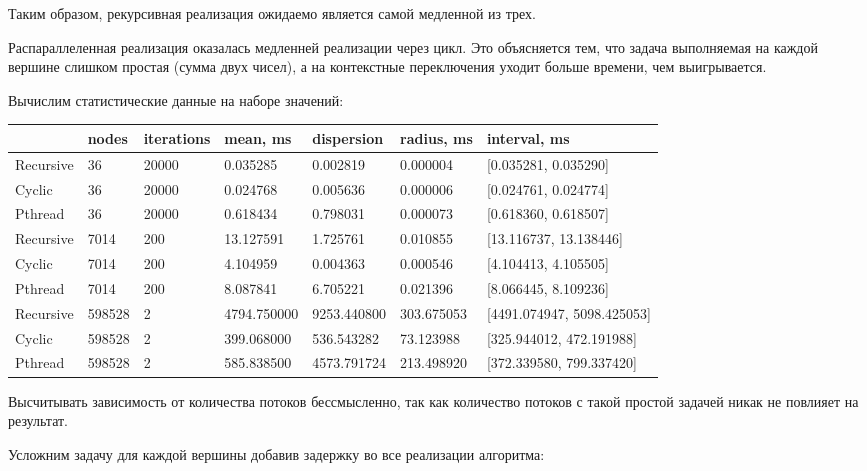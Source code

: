 \documentclass[14pt,a4paper,report]{report}
\begin{document}
Таким образом, рекурсивная реализация ожидаемо является самой медленной из трех.

Распараллеленная реализация оказалась медленней реализации через цикл. Это объясняется тем, что задача выполняемая на каждой вершине слишком простая (сумма двух чисел), а на контекстные переключения уходит больше времени, чем выигрывается.

Вычислим статистические данные на наборе значений:

\begin{table}[h!]
	\centering
	\bgroup
	\def\arraystretch{1}
	\begin{tabular}{ | m{1.5cm} | m{1.5cm} | m{1.5cm} | m{2.0cm} | m{2.0cm} | m{2.0cm} | m{4.1cm} | }
		\hline
		& nodes & iterations & mean, ms & dispersion & radius, ms & interval, ms \\ \hline
		Recursive & 36 & 20000 & 0.035285 & 0.002819 & 0.000004 & [0.035281, 0.035290] \\ \hline
		Cyclic & 36 & 20000 & 0.024768 & 0.005636 & 0.000006 & [0.024761, 0.024774] \\ \hline
		Pthread & 36 & 20000 & 0.618434 & 0.798031 & 0.000073 & [0.618360, 0.618507] \\ \hline \hline
		Recursive & 7014 & 200 & 13.127591 & 1.725761 & 0.010855 & [13.116737, 13.138446] \\ \hline
		Cyclic & 7014 & 200 & 4.104959 & 0.004363 & 0.000546 & [4.104413, 4.105505] \\ \hline
		Pthread & 7014 & 200 & 8.087841 & 6.705221 & 0.021396 & [8.066445, 8.109236] \\ \hline \hline
		Recursive & 598528 & 2 & 4794.750000 & 9253.440800 & 303.675053 & [4491.074947, 5098.425053] \\ \hline
		Cyclic & 598528 & 2 & 399.068000 & 536.543282 & 73.123988 & [325.944012, 472.191988] \\ \hline
		Pthread & 598528 & 2 & 585.838500 & 4573.791724 & 213.498920 & [372.339580, 799.337420] \\
		\hline
	\end{tabular}
	\egroup
\end{table}

Высчитывать зависимость от количества потоков бессмысленно, так как количество потоков с такой простой задачей никак не повлияет на результат.

Усложним задачу для каждой вершины добавив задержку во все реализации алгоритма:


\end{document}
